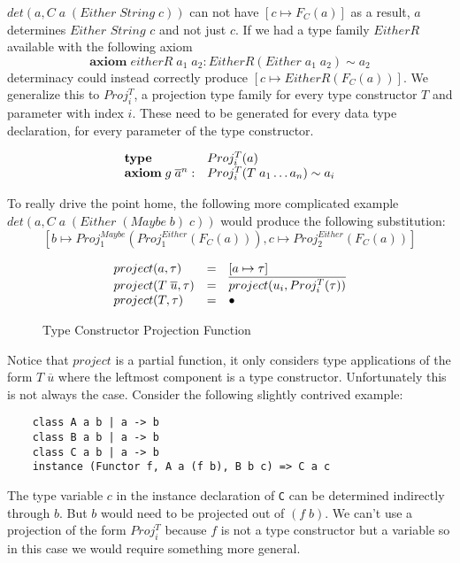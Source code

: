 $det(a, C \; a \; (Either \;
String \; c))$ can not have $[c \mapsto F_C(a)]$ as a result, $a$ determines
$Either$ $String$ $c$ and not just $c$. If we had a type family $EitherR$
available with the following axiom
\[
  \textbf{axiom} \; eitherR \; a_1 \; a_2 : EitherR(Either \; a_1 \; a_2) \sim a_2
\]
determinacy could instead correctly produce $[c \mapsto EitherR(F_C(a))]$. We
generalize this to $Proj^T_i$, a projection type family for every type
constructor $T$ and parameter with index $i$. These need to be generated for
every data type declaration, for every parameter of the type constructor.

\[
\begin{array}{l l}
  \textbf{type} \; &Proj^T_i(a)
  \\
  \textbf{axiom} \; g \; \overline{a}^n : &Proj^T_i(T \; a_1 \mathellipsis a_n)
  \sim a_i
\end{array}
\]

To really drive the point home, the following more complicated example $det(a, C
\; a \; (Either \; (Maybe \; b) \; c) )$ would produce the following
substitution:
\[
[ b \mapsto Proj^{Maybe}_1(Proj^{Either}_1(F_C(a))), c \mapsto
Proj^{Either}_2(F_C(a))]
\]

\begin{figure}
\[
\begin{array}{l c l}
    project(a, \tau) & = & [a \mapsto \tau]
    \\
    project(T \; \overline{u}, \tau) & = &
    \overline{project(u_i, Proj^T_i(\tau))}
    \\
    project(T, \tau) & = & \bullet
\end{array}
\]
\caption{Type Constructor Projection Function}
\label{fig:project}
\end{figure}

Notice that $project$ is a partial function, it only considers type applications
of the form $T \; \overline{u}$ where the leftmost component is a type
constructor. Unfortunately this is not always the case. Consider the following
slightly contrived example:

\begin{verbatim}
    class A a b | a -> b
    class B a b | a -> b
    class C a b | a -> b
    instance (Functor f, A a (f b), B b c) => C a c
\end{verbatim}

The type variable $c$ in the instance declaration of \texttt{C} can be
determined indirectly through $b$. But $b$ would need to be projected out of $(f
\; b)$. We can't use a projection of the form $Proj^T_i$ because $f$ is not a
type constructor but a variable so in this case we would require something more
general.

